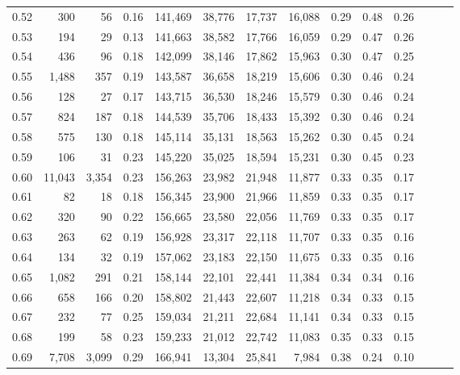 \begin{tabular}{rrrrrrrrrrrrrr}
0.52 &     300 &     56 &  0.16 &  141,469 &   38,776 &  17,737 &  16,088 &  0.29 &  0.48 &      0.26 \\
0.53 &     194 &     29 &  0.13 &  141,663 &   38,582 &  17,766 &  16,059 &  0.29 &  0.47 &      0.26 \\
0.54 &     436 &     96 &  0.18 &  142,099 &   38,146 &  17,862 &  15,963 &  0.30 &  0.47 &      0.25 \\
0.55 &   1,488 &    357 &  0.19 &  143,587 &   36,658 &  18,219 &  15,606 &  0.30 &  0.46 &      0.24 \\
0.56 &     128 &     27 &  0.17 &  143,715 &   36,530 &  18,246 &  15,579 &  0.30 &  0.46 &      0.24 \\
0.57 &     824 &    187 &  0.18 &  144,539 &   35,706 &  18,433 &  15,392 &  0.30 &  0.46 &      0.24 \\
0.58 &     575 &    130 &  0.18 &  145,114 &   35,131 &  18,563 &  15,262 &  0.30 &  0.45 &      0.24 \\
0.59 &     106 &     31 &  0.23 &  145,220 &   35,025 &  18,594 &  15,231 &  0.30 &  0.45 &      0.23 \\
0.60 &  11,043 &  3,354 &  0.23 &  156,263 &   23,982 &  21,948 &  11,877 &  0.33 &  0.35 &      0.17 \\
0.61 &      82 &     18 &  0.18 &  156,345 &   23,900 &  21,966 &  11,859 &  0.33 &  0.35 &      0.17 \\
0.62 &     320 &     90 &  0.22 &  156,665 &   23,580 &  22,056 &  11,769 &  0.33 &  0.35 &      0.17 \\
0.63 &     263 &     62 &  0.19 &  156,928 &   23,317 &  22,118 &  11,707 &  0.33 &  0.35 &      0.16 \\
0.64 &     134 &     32 &  0.19 &  157,062 &   23,183 &  22,150 &  11,675 &  0.33 &  0.35 &      0.16 \\
0.65 &   1,082 &    291 &  0.21 &  158,144 &   22,101 &  22,441 &  11,384 &  0.34 &  0.34 &      0.16 \\
0.66 &     658 &    166 &  0.20 &  158,802 &   21,443 &  22,607 &  11,218 &  0.34 &  0.33 &      0.15 \\
0.67 &     232 &     77 &  0.25 &  159,034 &   21,211 &  22,684 &  11,141 &  0.34 &  0.33 &      0.15 \\
0.68 &     199 &     58 &  0.23 &  159,233 &   21,012 &  22,742 &  11,083 &  0.35 &  0.33 &      0.15 \\
0.69 &   7,708 &  3,099 &  0.29 &  166,941 &   13,304 &  25,841 &   7,984 &  0.38 &  0.24 &      0.10 \\

\end{tabular}
